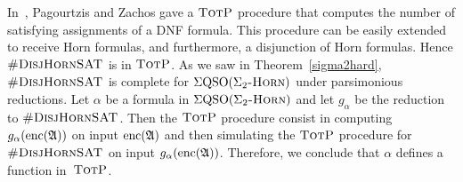 In~\cite{PagourtzisZ06}, Pagourtzis and Zachos gave a $\text{\sc TotP}$ procedure that computes the number of satisfying assignments of a DNF formula. This procedure can be easily extended to receive Horn formulas, and furthermore, a disjunction of Horn formulas. Hence $\textsc{\#DisjHornSAT}$ is in $\text{\sc TotP}$. As we saw in Theorem~\ref{sigma2hard}, $\textsc{\#DisjHornSAT}$ is complete for $\Sigma{\rm QSO}(\Sigma_2\textsc{-Horn})$ under parsimonious reductions. Let $\alpha$ be a formula in $\Sigma{\rm QSO}(\Sigma_2\textsc{-Horn})$ and let $g_{\alpha}$ be the reduction to $\textsc{\#DisjHornSAT}$. Then the $\text{\sc TotP}$ procedure consist in computing $g_{\alpha}({\rm enc}(\mathfrak{A}))$ on input ${\rm enc}(\mathfrak{A})$ and then simulating the $\text{\sc TotP}$ procedure for $\textsc{\#DisjHornSAT}$ on input $g_{\alpha}({\rm enc}(\mathfrak{A}))$. Therefore, we conclude that $\alpha$ defines a function in~$\text{\sc TotP}$.